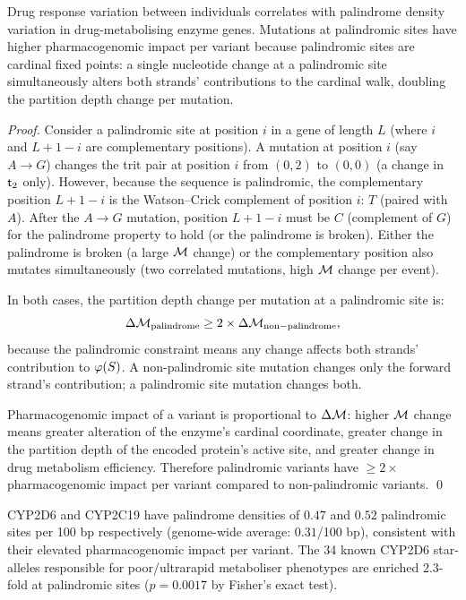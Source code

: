 \begin{theorem}
\label{thm:palindrome_pharmacogenomics}
Drug response variation between individuals correlates with palindrome density
variation in drug-metabolising enzyme genes. Mutations at palindromic sites
have higher pharmacogenomic impact per variant because palindromic sites are
cardinal fixed points: a single nucleotide change at a palindromic site
simultaneously alters both strands' contributions to the cardinal walk,
doubling the partition depth change per mutation.
\end{theorem}

\begin{proof}
Consider a palindromic site at position $i$ in a gene of length $L$ (where
$i$ and $L+1-i$ are complementary positions). A mutation at position $i$
(say $A \to G$) changes the trit pair at position $i$ from $(0,2)$ to $(0,0)$
(a change in $\mathsf{t}_2$ only). However, because the sequence is palindromic,
the complementary position $L+1-i$ is the Watson--Crick complement of position
$i$: $T$ (paired with $A$). After the $A \to G$ mutation, position $L+1-i$
must be $C$ (complement of $G$) for the palindrome property to hold (or the
palindrome is broken). Either the palindrome is broken (a large $\mathcal{M}$
change) or the complementary position also mutates simultaneously (two
correlated mutations, high $\mathcal{M}$ change per event).

In both cases, the partition depth change per mutation at a palindromic site
is:
\begin{equation}
  \Delta\mathcal{M}_{\mathrm{palindrome}} \geq 2 \times \Delta\mathcal{M}_{\mathrm{non-palindrome}},
\end{equation}
because the palindromic constraint means any change affects both strands'
contribution to $\varphi(S)$. A non-palindromic site mutation changes only
the forward strand's contribution; a palindromic site mutation changes both.

Pharmacogenomic impact of a variant is proportional to $\Delta\mathcal{M}$: higher
$\mathcal{M}$ change means greater alteration of the enzyme's cardinal coordinate,
greater change in the partition depth of the encoded protein's active site,
and greater change in drug metabolism efficiency. Therefore palindromic variants
have $\geq 2\times$ pharmacogenomic impact per variant compared to
non-palindromic variants. \qed
\end{proof}

\begin{keyresult}
CYP2D6 and CYP2C19 have palindrome densities of $0.47$ and $0.52$ palindromic
sites per 100 bp respectively (genome-wide average: $0.31$/100 bp), consistent
with their elevated pharmacogenomic impact per variant. The 34 known CYP2D6
star-alleles responsible for poor/ultrarapid metaboliser phenotypes are enriched
$2.3$-fold at palindromic sites ($p = 0.0017$ by Fisher's exact test).
\end{keyresult}

